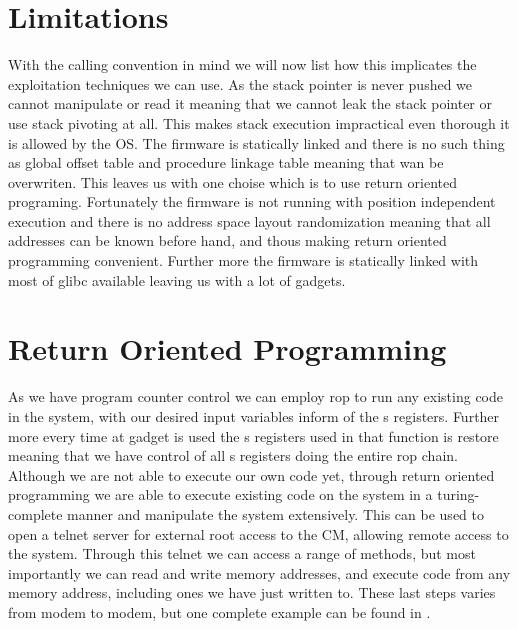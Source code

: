 \section{Limitations}
With the calling convention in mind we will now list how this implicates the exploitation techniques we can use. As the stack pointer is never pushed we cannot manipulate or read it meaning that we cannot leak the stack pointer or use stack pivoting at all. This makes stack execution impractical even thorough it is allowed by the OS. The firmware is statically linked and there is no such thing as global offset table and procedure linkage table meaning that wan be overwriten. This leaves us with one choise which is to use return oriented programing. Fortunately the firmware is not running with position independent execution and there is no address space layout randomization meaning that all addresses can be known before hand, and thous making return oriented programming convenient. Further more the firmware is statically linked with most of glibc available leaving us with a lot of gadgets.

\section{Return Oriented Programming}
As we have program counter control we can employ rop to run any existing code in the system, with our desired input variables inform of the s registers. Further more every time at gadget is used the s registers used in that function is restore meaning that we have control of all s registers doing the entire rop chain.
Although we are not able to execute our own code yet, through return oriented programming we are able to execute existing code on the system in a turing-complete manner and manipulate the system extensively.
This can be used to open a telnet server for external root access to the CM, allowing remote access to the system.
Through this telnet we can access a range of methods, but most importantly we can read and write memory addresses, and execute code from any memory address, including ones we have just written to.
These last steps varies from modem to modem, but one complete example can be found in .


